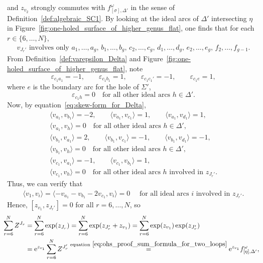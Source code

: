 \documentclass[pdftex]{sigma}
\numberwithin{equation}{section}
\theoremstyle{definition}
\begin{document}
and $z_{v_2}$ strongly commutes with $f^\omega_{[\sigma],\Delta'}$ in the sense of Definition~\ref{def:algebraic_SC1}.
By looking at the ideal arcs of $\Delta'$ intersecting $\eta$ in Figure~\ref{fig:one-holed_surface_of_higher_genus_flat}, one finds that for each $r\in\{6,\dots,N\}$,
\begin{align}
\label{eq:ohs_proof_v_J_r_prime_involves}
\mbox{$v_{J_r'}$ involves only $a_1,\dots,a_g$, $b_1,\dots,b_g$, $c_2,\dots,c_g$, $d_1,\dots,d_g$, $e_2,\dots,e_g$, $f_2,\dots,f_{g-1}$.}\!\!\!
\end{align}
From Definition~\ref{def:varepsilon_Delta} and Figure~\ref{fig:one-holed_surface_of_higher_genus_flat}, note
\[
\varepsilon_{c_1 a_1} = -1, \qquad
\varepsilon_{c_1 b_1} = 1, \qquad
\varepsilon_{c_1 c_1'} = -1, \qquad
\varepsilon_{c_1 e} = 1,
\]
where $e$ is the boundary arc for the hole of $\Sigma'$,
\[
\varepsilon_{c_1 h} =0 \quad \mbox{for all other ideal arcs $h \in \Delta'$}.
\]
Now, by equation~\eqref{eq:skew-form_for_Delta},
\begin{gather*}
 \langle v_{a_1}, v_{b_1}\rangle = -2, \qquad
\langle v_{a_1}, v_{c_1}\rangle = 1, \qquad
\langle v_{a_1}, v_{d_1}\rangle = 1, \\
\langle v_{a_1},v_h\rangle=0 \quad \mbox{for all other ideal arcs $h \in \Delta'$}, \\
\langle v_{b_1}, v_{a_1}\rangle=2,\qquad
\langle v_{b_1}, v_{c_1}\rangle = -1,\qquad
\langle v_{b_1},v_{d_1}\rangle = -1, \\
\langle v_{b_1},v_h\rangle=0 \quad \mbox{for all other ideal arcs $h \in \Delta'$}, \\
\langle v_{c_1}, v_{a_1}\rangle = -1, \qquad
\langle v_{c_1}, v_{b_1}\rangle = 1, \\
\langle v_{c_1}, v_h\rangle=0 \quad \mbox{for all other ideal arcs $h$ involved in $z_{J_r'}$}.
\end{gather*}
Thus, we can verify that
\begin{align}
\label{eq:ohs_proof_some_commutations2}
\langle v_1, v_i \rangle = \langle -v_{a_1}-v_{b_1}-2v_{c_1},v_i \rangle = 0 \quad \mbox{ for all ideal arcs $i$ involved in $z_{J_r'}$.}
\end{align}
Hence, $[z_{v_1},z_{J_r'}]=0$ for all $r=6,\dots,N$, so
\begin{align*}
\hspace{-2mm} \sum_{r=6}^{N} Z^{J_r} & = \sum_{r=6}^{N} \exp(z_{J_r})
= \sum_{r=6}^{N} \exp(z_{J_r'} + z_{v_1})
= \sum_{r=6}^{N} \exp(z_{v_1}) \exp(z_{J_r'}) \\
& = {\rm e}^{z_{v_1}} \sum_{r=6}^{N} Z^{J_r'}
\stackrel{{\rm equation}~\eqref{eq:ohs_proof_sum_formula_for_two_loops}}{=} {\rm e}^{z_{v_1}} f^\omega_{[\eta],\Delta'},
\end{align*}
\end{document}
